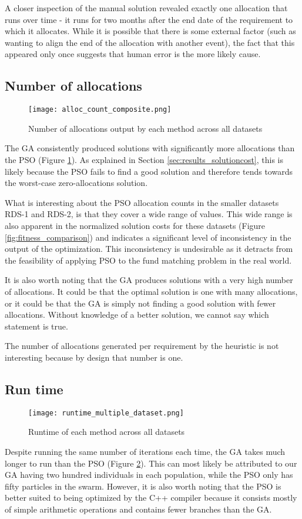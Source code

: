 \documentclass{sig-alternate}
\begin{document}
A closer inspection of the manual solution revealed exactly one allocation that runs over time - it runs for two months after the end date of the requirement to which it allocates. While it is possible that there is some external factor (such as wanting to align the end of the allocation with another event), the fact that this appeared only once suggests that human error is the more likely cause.

\subsection{Number of allocations}
\begin{figure}
	\texttt{[image: alloc\_count\_composite.png]}
	\caption{Number of allocations output by each method across all datasets}
	\label{fig:alloc_count_comparison}
\end{figure}
The GA consistently produced solutions with significantly more allocations than the PSO (Figure \ref{fig:alloc_count_comparison}). As explained in Section \ref{sec:results_solutioncost}, this is likely because the PSO fails to find a good solution and therefore tends towards the worst-case zero-allocations solution.

What is interesting about the PSO allocation counts in the smaller datasets RDS-1 and RDS-2, is that they cover a wide range of values. This wide range is also apparent in the normalized solution costs for these datasets (Figure \ref{fig:fitness_comparison}) and indicates a significant level of inconsistency in the output of the optimization. This inconsistency is undesirable as it detracts from the feasibility of applying PSO to the fund matching problem in the real world.

It is also worth noting that the GA produces solutions with a very high number of allocations. It could be that the optimal solution is one with many allocations, or it could be that the GA is simply not finding a good solution with fewer allocations. Without knowledge of a better solution, we cannot say which statement is true.

The number of allocations generated per requirement by the heuristic is not interesting because by design that number is one.

\subsection{Run time}
\begin{figure}
	\texttt{[image: runtime\_multiple\_dataset.png]}
	\caption{Runtime of each method across all datasets}
	\label{fig:runtime}
\end{figure}
Despite running the same number of iterations each time, the GA takes much longer to run than the PSO (Figure \ref{fig:runtime}). This can most likely be attributed to our GA having two hundred individuals in each population, while the PSO only has fifty particles in the swarm. However, it is also worth noting that the PSO is better suited to being optimized by the C++ compiler because it consists mostly of simple arithmetic operations and contains fewer branches than the GA.
\end{document}
